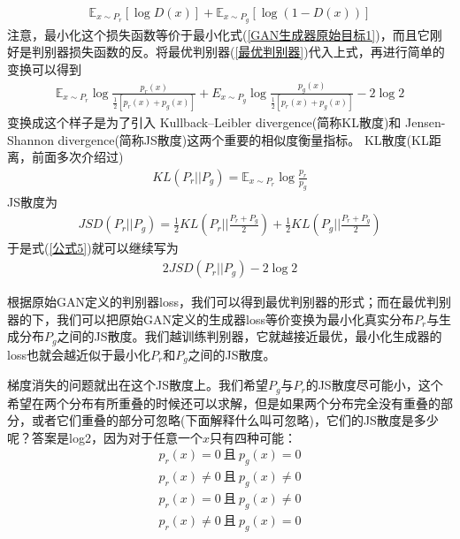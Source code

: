             \begin{align*}
            \mathbb{E}_{x\sim P_r}[\log D(x)] + \mathbb{E}_{x\sim P_g}[\log (1-D(x))]
            \end{align*}
            注意，最小化这个损失函数等价于最小化式(\ref{GAN生成器原始目标1})，而且它刚好是判别器损失函数的反。将最优判别器(\ref{最优判别器})代入上式，再进行简单的变换可以得到
            \begin{align}
            \label{公式5}
            \mathbb{E}_{x\sim P_r}\log \frac{p_r(x)}{\frac{1}{2}[p_r(x) + p_g(x)]} + E_{x\sim P_g}\log \frac{p_g(x)}{\frac{1}{2}[p_r(x)+p_g(x)]} - 2\log 2
            \end{align}
            变换成这个样子是为了引入 Kullback–Leibler divergence(简称KL散度)和 Jensen-Shannon divergence(简称JS散度)这两个重要的相似度衡量指标。
            KL散度(KL距离，前面多次介绍过)
            \begin{align*}
            KL(P_r||P_g) = \mathbb{E}_{x\sim P_r}\log \frac{p_r}{p_g}
            \end{align*}
            JS散度为
            \begin{align}
            \label{JS散度}
            JSD(P_r||P_g) = \frac{1}{2}KL \left( P_r \Big|\Big| \frac{P_r+P_g}{2} \right) + \frac{1}{2} KL\left( P_g \Big|\Big| \frac{P_r+P_g}{2} \right)
            \end{align}
            于是式(\ref{公式5})就可以继续写为
            \begin{align*}
            2JSD(P_r||P_g) - 2\log 2
            \end{align*}
            \par
            根据原始GAN定义的判别器loss，我们可以得到最优判别器的形式；而在最优判别器的下，我们可以把原始GAN定义的生成器loss等价变换为最小化真实分布$P_r$与生成分布$P_g$之间的JS散度。我们越训练判别器，它就越接近最优，最小化生成器的loss也就会越近似于最小化$P_r$和$P_g$之间的JS散度。
            \par
            梯度消失的问题就出在这个JS散度上。我们希望$P_g$与$P_r$的JS散度尽可能小，这个希望在两个分布有所重叠的时候还可以求解，但是如果两个分布完全没有重叠的部分，或者它们重叠的部分可忽略(下面解释什么叫可忽略)，它们的JS散度是多少呢？答案是log2，因为对于任意一个$x$只有四种可能：
            \begin{align*}
            p_r(x) = 0 \ \text{且} \ p_g(x) = 0\\
            p_r(x) \neq 0 \ \text{且} \ p_g(x) \neq 0\\
            p_r(x) = 0 \ \text{且} \ p_g(x) \neq 0\\
            p_r(x) \neq 0 \ \text{且} \ p_g(x) = 0
            \end{align*}
